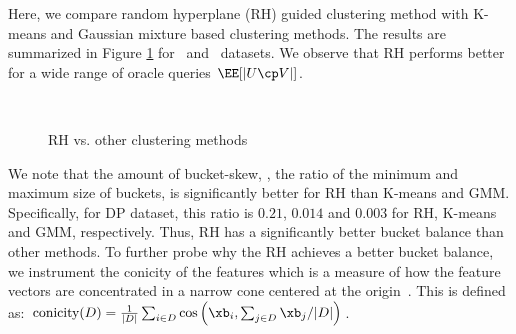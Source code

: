 \documentclass[letterpaper]{article}
\renewcommand{\cite}{\citep}
\begin{document}
%
Here, we compare random hyperplane (RH) guided clustering method with K-means and Gaussian mixture based clustering methods.
The results are summarized in Figure \ref{fig:K-means} for \dpr\ and \cifar\ datasets.  We observe that RH performs better for a wide range of oracle queries $\EE[|U\cp V|]$.
\begin{figure}[h!]
    \centering
 \\[-0.1ex]
 \hspace{3mm}
\hspace{0.5mm}
\caption{\small RH vs. other clustering methods}
\label{fig:K-means}
\end{figure}
We note that the amount of bucket-skew, \ie, the ratio of the minimum and maximum size of buckets, is significantly better  for RH than K-means and GMM.  Specifically, for DP dataset, this ratio is $0.21$, $0.014$ and $0.003$ for RH, K-means and GMM, respectively. Thus, RH has a significantly better bucket balance than other methods.
To further probe why the RH achieves a better bucket balance, we instrument the conicity of the features which is a measure of how the feature vectors are concentrated in a narrow cone centered at the origin~\cite{sharma2018towards}. This is defined as:
$    \text{conicity}(D) = \frac{1}{|D|}\sum_{i\in D}\cos\left(\xb_i, {\sum_{j\in D} \xb_j}/{|D|} \right)$.
%
\end{document}
